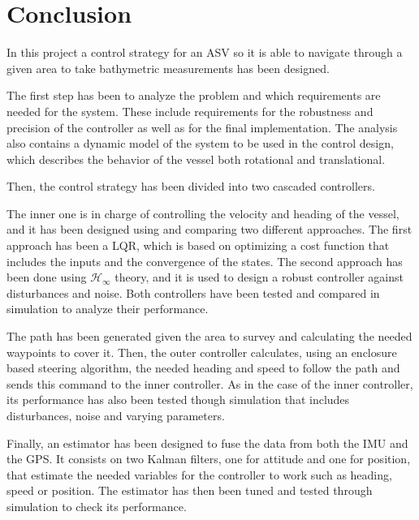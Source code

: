 \chapter{Conclusion}\label{chap:conclusion}

In this project a control strategy for an ASV so it is able to navigate through a given area to take bathymetric measurements has been designed.

The first step has been to analyze the problem and which requirements are needed for the system. These include requirements for the robustness and precision of the controller as well as for the final implementation. The analysis also contains a dynamic model of the system to be used in the control design, which describes the behavior of the vessel both rotational and translational.

Then, the control strategy has been divided into two cascaded controllers. 

The inner one is in charge of controlling the velocity and heading of the vessel, and it has been designed using and comparing two different approaches. The first approach has been a LQR, which is based on optimizing a cost function that includes the inputs and the convergence of the states. The second approach has been done using $\mathcal{H}_\infty$ theory, and it is used to design a robust controller against disturbances and noise. Both controllers have been tested and compared in simulation to analyze their performance.

The path has been generated given the area to survey and calculating the needed waypoints to cover it. Then, the outer controller calculates, using an enclosure based steering algorithm, the needed heading and speed to follow the path and sends this command to the inner controller. As in the case of the inner controller, its performance has also been tested though simulation that includes disturbances, noise and varying parameters.

Finally, an estimator has been designed to fuse the data from both the IMU and the GPS. It consists on two Kalman filters, one for attitude and one for position, that estimate the needed variables for the controller to work such as heading, speed or position. The estimator has then been tuned and tested through simulation to check its performance.

